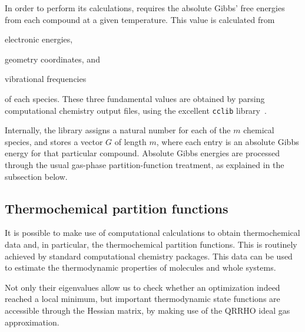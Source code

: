 In order to perform its calculations,
\overreact{} requires the absolute Gibbs' free energies from each compound at a given temperature.
This value is calculated from
\begin{enumerate*}
	\item electronic energies,
	\item geometry coordinates,
	      and
	\item vibrational frequencies
\end{enumerate*}
of each species.
These three fundamental values are obtained
by parsing computational chemistry output files,
using the excellent \texttt{cclib} library~\cite{O_boyle_2008}.

Internally,
the library assigns a natural number for each of the $m$ chemical species,
and stores a vector $G$ of length $m$,
where each entry is an absolute Gibbs energy for that particular compound.
Absolute Gibbs energies are processed through the usual gas-phase partition-function treatment,
as explained in the subsection below.

\subsection{Thermochemical partition functions}%
\label{sec:qrrho}

It is possible to make use of computational calculations to obtain
thermochemical data and,
in particular,
the thermochemical partition
functions.
This is routinely achieved by standard computational chemistry packages.
This data can be used to estimate the thermodynamic properties of molecules and
whole systems.

Not only their eigenvalues allow us to check whether an optimization indeed reached a local minimum,
but important thermodynamic state functions are accessible through the Hessian matrix,
by making use of the QRRHO ideal gas approximation.


